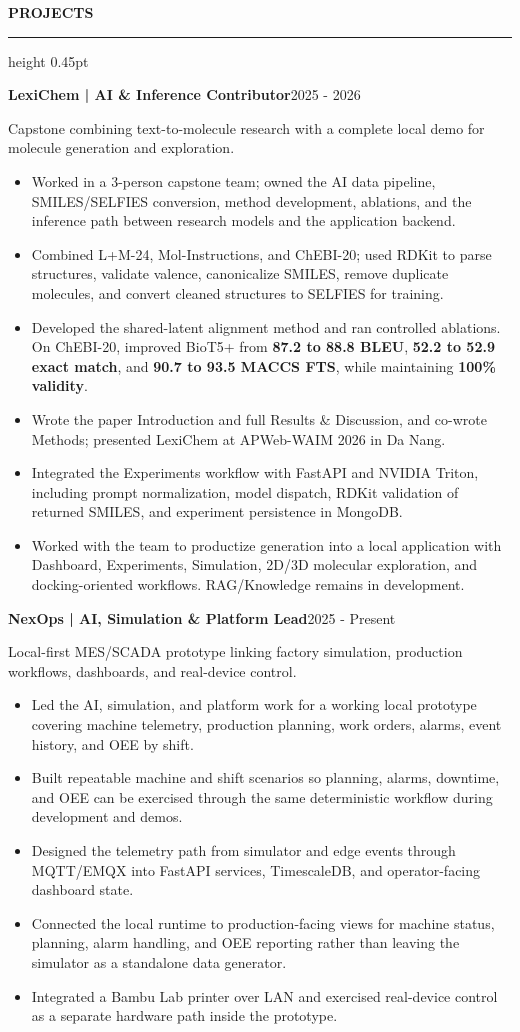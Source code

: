 \documentclass[10pt]{article}
\newcommand{\cvsection}[1]{%
    \vspace{6.2pt}%
    {\color{accent}\bfseries\small #1}\par
    \vspace{2.3pt}%
    {\color{rulegray}\hrule height 0.45pt}\vspace{4.0pt}%
}
\newcommand{\entry}[2]{%
    \textbf{#1}\hfill {\color{muted}\small #2}\par
}
\newcommand{\subentry}[1]{%
    {\color{muted}\small #1}\par
}
\begin{document}
\cvsection{PROJECTS}
\entry{LexiChem | AI \& Inference Contributor}{2025 - 2026}
\subentry{Capstone combining text-to-molecule research with a complete local demo for molecule generation and exploration.}
\begin{itemize}
    \item Worked in a 3-person capstone team; owned the AI data pipeline, SMILES/SELFIES conversion, method development, ablations, and the inference path between research models and the application backend.
    \item Combined L+M-24, Mol-Instructions, and ChEBI-20; used RDKit to parse structures, validate valence, canonicalize SMILES, remove duplicate molecules, and convert cleaned structures to SELFIES for training.
    \item Developed the shared-latent alignment method and ran controlled ablations. On ChEBI-20, improved BioT5+ from \textbf{87.2 to 88.8 BLEU}, \textbf{52.2 to 52.9 exact match}, and \textbf{90.7 to 93.5 MACCS FTS}, while maintaining \textbf{100\% validity}.
    \item Wrote the paper Introduction and full Results \& Discussion, and co-wrote Methods; presented LexiChem at APWeb-WAIM 2026 in Da Nang.
    \item Integrated the Experiments workflow with FastAPI and NVIDIA Triton, including prompt normalization, model dispatch, RDKit validation of returned SMILES, and experiment persistence in MongoDB.
    \item Worked with the team to productize generation into a local application with Dashboard, Experiments, Simulation, 2D/3D molecular exploration, and docking-oriented workflows. RAG/Knowledge remains in development.
\end{itemize}

\entry{NexOps | AI, Simulation \& Platform Lead}{2025 - Present}
\subentry{Local-first MES/SCADA prototype linking factory simulation, production workflows, dashboards, and real-device control.}
\begin{itemize}
    \item Led the AI, simulation, and platform work for a working local prototype covering machine telemetry, production planning, work orders, alarms, event history, and OEE by shift.
    \item Built repeatable machine and shift scenarios so planning, alarms, downtime, and OEE can be exercised through the same deterministic workflow during development and demos.
    \item Designed the telemetry path from simulator and edge events through MQTT/EMQX into FastAPI services, TimescaleDB, and operator-facing dashboard state.
    \item Connected the local runtime to production-facing views for machine status, planning, alarm handling, and OEE reporting rather than leaving the simulator as a standalone data generator.
    \item Integrated a Bambu Lab printer over LAN and exercised real-device control as a separate hardware path inside the prototype.
\end{itemize}
\end{document}
